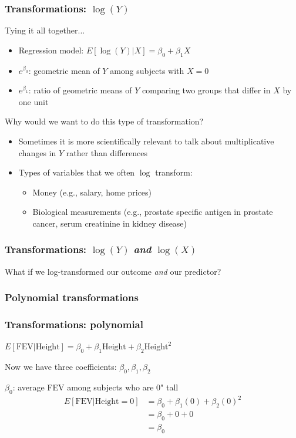 \documentclass[12pt, 
hyperref={colorlinks=true, linkcolor=blue, urlcolor=cyan},dvipsnames]{beamer}
\begin{document}
\begin{frame}
\frametitle{Transformations: $\log(Y)$}
Tying it all together...
\begin{itemize}
\item \color{blue} Regression model: \color{black} $E[\log(Y)|X] = \beta_0 + \beta_1X$
\item \color{blue} $e^{\beta_0}$: \color{black} geometric mean of $Y$ among subjects with $X = 0$
\item \color{blue} $e^{\beta_1}$: \color{black} ratio of geometric means of $Y$ comparing two groups that differ in $X$ by one unit
\end{itemize}\pause

Why would we want to do this type of transformation?\vspace{-0.3cm}
\begin{itemize}
\item Sometimes it is more scientifically relevant to talk about multiplicative changes in $Y$ rather than differences
\item Types of variables that we often $\log$ transform:
	\begin{itemize}
	\item Money (e.g., salary, home prices)
	\item Biological measurements (e.g., prostate specific antigen in prostate cancer, serum creatinine in kidney disease)
	\end{itemize}
\end{itemize}
\end{frame}

\begin{frame}
\frametitle{Transformations: $\log(Y)$ \textit{and} $\log(X)$}
\center What if we log-transformed our outcome \textit{and} our predictor? %
\end{frame}

\subsubsection{Polynomial transformations}
\begin{frame}
\frametitle{Transformations: polynomial}
\begin{center} $E[\text{FEV}| \text{Height}] = \beta_0 + \beta_1 \text{Height} + \beta_2 \text{Height}^2$ \end{center}

Now we have three coefficients: $\beta_0, \beta_1, \beta_2$\pause

\color{blue} $\beta_0$: average FEV among subjects who are 0" tall \color{black} \pause
\begin{align*}
E[\text{FEV}|\text{Height} = 0] & = \beta_0 + \beta_1 (0) + \beta_2(0)^2 \\
& = \beta_0 + 0 + 0 \\
& = \beta_0
\end{align*}
\end{frame}
\end{document}
